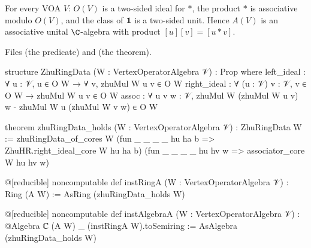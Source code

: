 \begin{theorem}\label{l12:thm:zhuring}
For every VOA $V$: $O(V)$ is a two-sided ideal for $*$, the product $*$ is associative modulo $O(V)$, and the
class of $\mathbf{1}$ is a two-sided unit. Hence $A(V)$ is an associative unital $\C$-algebra with product
$[u][v] = [u*v]$.
\end{theorem}
\noindent Files  (the predicate) and
 (the theorem).
\begin{leancode}
structure ZhuRingData (W : VertexOperatorAlgebra 𝒱) : Prop where
  left_ideal : ∀ {u : 𝒱}, u ∈ O W → ∀ v, zhuMul W u v ∈ O W
  right_ideal : ∀ (u : 𝒱) {v : 𝒱}, v ∈ O W → zhuMul W u v ∈ O W
  assoc : ∀ u v w : 𝒱, zhuMul W (zhuMul W u v) w - zhuMul W u (zhuMul W v w) ∈ O W

theorem zhuRingData_holds (W : VertexOperatorAlgebra 𝒱) : ZhuRingData W :=
  zhuRingData_of_cores W
    (fun _ _ _ _ hu ha b => ZhuHR.right_ideal_core W hu ha b)
    (fun _ _ _ _ hu hv w => associator_core W hu hv w)

@[reducible] noncomputable def instRingA (W : VertexOperatorAlgebra 𝒱) : Ring (A W) :=
  AsRing (zhuRingData_holds W)

@[reducible] noncomputable def instAlgebraA (W : VertexOperatorAlgebra 𝒱) :
    @Algebra ℂ (A W) _ (instRingA W).toSemiring :=
  AsAlgebra (zhuRingData_holds W)
\end{leancode}


